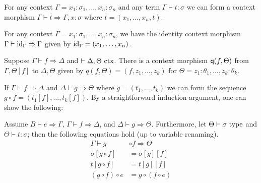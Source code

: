 \documentclass[a4paper]{article}
\begin{document}
\begin{example}
  For any context $\Gamma = x_1 : \sigma_1,\ldots,x_n : \sigma_n$ and any term $\Gamma \vdash t : \sigma$ we can form a context morphism $\Gamma \vdash \overline{t} \Rightarrow \Gamma, x : \sigma$ where $\overline{t} = (x_1,\ldots,x_n,t)$.
\end{example}

\begin{example}
  For any context $\Gamma = x_1 : \sigma_1,\ldots,x_n : \sigma_n$, we have the identity context morphism $\Gamma \vdash \mathrm{id}_{\Gamma} \Rightarrow \Gamma$ given by $\mathrm{id}_{\Gamma} = (x_1,\ldots,x_n)$.
\end{example}

\begin{example}
  Suppose $\Gamma \vdash f \Rightarrow \Delta$ and $\vdash \Delta,\Theta~\mathrm{ctx}$.
  There is a context morphism $\operatorname{\mathsf{q}}(f,\Theta)$ from $\Gamma,\Theta[f]$ to $\Delta,\Theta$ given by $q(f,\Theta) = (f, z_1,\ldots,z_k)$ for $\Theta = z_1 : \theta_1,\ldots,z_k : \theta_k$.
\end{example}

If $\Gamma \vdash f \Rightarrow \Delta$ and $\Delta \vdash g \Rightarrow \Theta$ where $g = (t_1,\ldots,t_k)$ we can form the sequence $g \circ f = (t_1[f],\ldots,t_k[f])$.
By a straightforward induction argument, one can show the following:

\begin{proposition}
  Assume $B \vdash e \Rightarrow \Gamma$, $\Gamma \vdash f \Rightarrow \Delta$, and $\Delta \vdash g \Rightarrow \Theta$.
  Furthermore, let $\Theta \vdash \sigma~\mathrm{type}$ and $\Theta \vdash t : \sigma$; then the following equations hold (up to variable renaming).
  \begin{align*}
    \Gamma \vdash g &\circ f \Rightarrow \Theta\\
    \sigma[g \circ f] &= \sigma[g][f]\\
    t[g \circ f] &= t[g][f]\\
    (g \circ f) \circ e &= g \circ (f \circ e)
  \end{align*}
\end{proposition}
\end{document}

